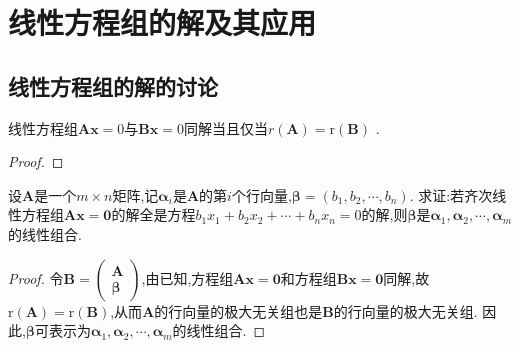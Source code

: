 \documentclass[../../main.tex]{subfiles}%
\begin{document}
\section{线性方程组的解及其应用}

\subsection{线性方程组的解的讨论}

\begin{proposition}\label{proposition:线性方程组同解系数矩阵秩相同}
线性方程组$\boldsymbol{Ax}=0$与$\boldsymbol{Bx}=0$同解当且仅当$r\left( \boldsymbol{A} \right) =\mathrm{r}\left( \boldsymbol{B} \right)$ .
\end{proposition}
\begin{proof}



\end{proof}

\begin{example}
设\(\boldsymbol{A}\)是一个\(m\times n\)矩阵,记\(\boldsymbol{\alpha}_i\)是\(\boldsymbol{A}\)的第\(i\)个行向量,\(\boldsymbol{\beta}=(b_1,b_2,\cdots,b_n)\). 求证:若齐次线性方程组\(\boldsymbol{A}\boldsymbol{x}=\boldsymbol{0}\)的解全是方程\(b_1x_1 + b_2x_2+\cdots + b_nx_n = 0\)的解,则\(\boldsymbol{\beta}\)是\(\boldsymbol{\alpha}_1,\boldsymbol{\alpha}_2,\cdots,\boldsymbol{\alpha}_m\)的线性组合.
\end{example}
\begin{proof}

令\(\boldsymbol{B}=\begin{pmatrix}
\boldsymbol{A}\\
\boldsymbol{\beta}
\end{pmatrix}\),由已知,方程组\(\boldsymbol{A}\boldsymbol{x}=\boldsymbol{0}\)和方程组\(\boldsymbol{B}\boldsymbol{x}=\boldsymbol{0}\)同解,故\(\mathrm{r}(\boldsymbol{A})=\mathrm{r}(\boldsymbol{B})\),从而\(\boldsymbol{A}\)的行向量的极大无关组也是\(\boldsymbol{B}\)的行向量的极大无关组. 因此,\(\boldsymbol{\beta}\)可表示为\(\boldsymbol{\alpha}_1,\boldsymbol{\alpha}_2,\cdots,\boldsymbol{\alpha}_m\)的线性组合. 

\end{proof}
\end{document}
